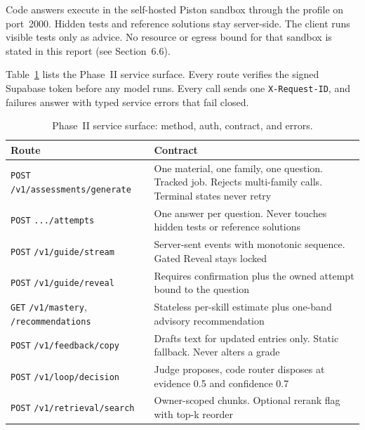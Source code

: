 Code answers execute in the self-hosted Piston sandbox through the profile on port~2000. Hidden tests and reference solutions stay server-side. The client runs visible tests only as advice. No resource or egress bound for that sandbox is stated in this report (see Section~6.6).

Table~\ref{tab:phase2-api} lists the Phase~II service surface. Every route verifies the signed Supabase token before any model runs. Every call sends one \texttt{X-Request-ID}, and failures answer with typed service errors that fail closed.

\begin{table}[htbp]
\centering
\footnotesize
\caption{Phase~II service surface: method, auth, contract, and errors.}
\label{tab:phase2-api}
\begin{tabular}{p{4.6cm} p{7.8cm}}
\toprule
\textbf{Route} & \textbf{Contract} \\
\midrule
\texttt{POST} \newline \texttt{/v1/assessments/generate} & One material, one family, one question. Tracked job. Rejects multi-family calls. Terminal states never retry \\
\texttt{POST} \newline \texttt{.../attempts} & One answer per question. Never touches hidden tests or reference solutions \\
\texttt{POST} \newline \texttt{/v1/guide/stream} & Server-sent events with monotonic sequence. Gated Reveal stays locked \\
\texttt{POST} \newline \texttt{/v1/guide/reveal} & Requires confirmation plus the owned attempt bound to the question \\
\texttt{GET} \newline \texttt{/v1/mastery}, \texttt{/recommendations} & Stateless per-skill estimate plus one-band advisory recommendation \\
\texttt{POST} \newline \texttt{/v1/feedback/copy} & Drafts text for updated entries only. Static fallback. Never alters a grade \\
\texttt{POST} \newline \texttt{/v1/loop/decision} & Judge proposes, code router disposes at evidence 0.5 and confidence 0.7 \\
\texttt{POST} \newline \texttt{/v1/retrieval/search} & Owner-scoped chunks. Optional rerank flag with top-k reorder \\
\bottomrule
\end{tabular}
\end{table}


